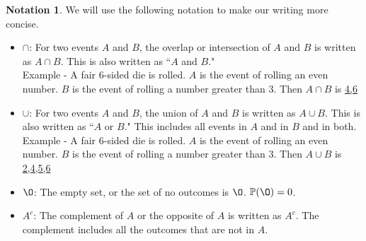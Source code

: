 \documentclass[12pt]{article}
\newcommand{\bbP}{\mathbb{P}}
\renewcommand{\emptyset}{\O}
\renewcommand{\_}[1]{\underline{ #1 }}
\theoremstyle{definition}
\newtheorem{notation}[theorem]{Notation}
\numberwithin{equation}{subsection}
\begin{document}
\begin{notation} We will use the following notation to make our writing more concise.
	\begin{itemize}
 		\item $\cap$: For two events $A$ and $B$, the overlap or intersection of $A$ and $B$ is written as $A\cap B$. This is also written as ``$A$ and $B$." \\
 		 Example - A fair 6-sided die is rolled. $A$ is the event of rolling an even number. $B$ is the event of rolling a number greater than 3. Then $A\cap B$ is \_{4,6}
 		 \item $\cup$: For two events $A$ and $B$, the union of $A$ and $B$ is written as $A\cup B$. This is also written as ``$A$ or $B$." This includes all events in $A$ and in $B$ and in both.\\
 		 Example - A fair 6-sided die is rolled. $A$ is the event of rolling an even number. $B$ is the event of rolling a number greater than 3. Then $A\cup B$ is \_{2,4,5,6}
 		 \item  $\emptyset$: The empty set, or the set of no outcomes is $\emptyset$. $\bbP(\emptyset)=0$.
 		 \item $A^c$: The complement of $A$ or the opposite of $A$ is written as $A^c$. The complement includes all the outcomes that are not in $A$.
 	\end{itemize}
\end{notation}
\end{document}
